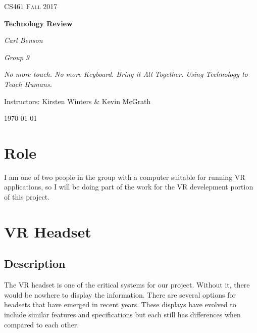 \documentclass[letterpaper,10pt,onecolumn]{IEEEtran}
\begin{document}
\sloppy

\begin{titlepage}
	\centering
	{\scshape\Large CS461 Fall 2017\par}
	\vspace{1.5cm}
	{\huge\bfseries Technology Review\par}
  \vspace{2cm}

	{\Large\itshape Carl Benson\par}
  {\Large\itshape Group 9\par}
  {\Large\itshape No more touch. No more Keyboard. Bring it All Together. Using Technology to Teach Humans.\par}
	Instructors: Kirsten Winters \& Kevin McGrath\par
  {\large \today\par}
  \begin{abstract}
  Technology is increasing at an amazing rate, and with it comes many opportunities. Headmounted displays can completely immerse a user in a virtual world. Computers can share the contents of nearly all human knowledge in the blink of an eye. They can even identify and react to occurences in ways similar to that of humans. This paper will cover thre options each for virtual reality headsets, data hosting, and machine learning frameworks as well as compare and contrast them.
  \end{abstract}

\end{titlepage}

\clearpage
\tableofcontents

\section{Role}
    I am one of two people in the group with a computer suitable for running VR applications, so I will be doing part of the work for the VR develepment portion of this project. 

\section{VR Headset}
  \subsection {Description} The VR headset is one of the critical systems for our project. Without it, there would be nowhere to display the information. There are several options for headsets that have emerged in recent years. These displays have evolved to include similar features and specifications but each still has differences when compared to each other.
\end{document}
